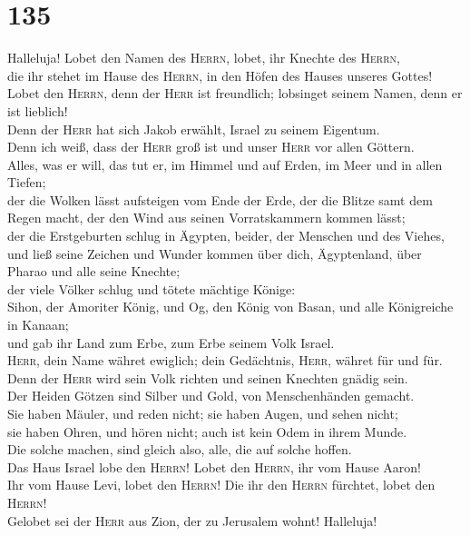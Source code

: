 \hypertarget{section-134}{%
\section{135}\label{section-134}}

 Halleluja! Lobet den Namen des \textsc{Herrn}, lobet, ihr
Knechte des \textsc{Herrn},\\
 die ihr stehet im Hause des \textsc{Herrn}, in den Höfen
des Hauses unseres Gottes!\\
 Lobet den \textsc{Herrn}, denn der \textsc{Herr} ist
freundlich; lobsinget seinem Namen, denn er ist lieblich!\\
 Denn der \textsc{Herr} hat sich Jakob erwählt, Israel zu
seinem Eigentum.\\
 Denn ich weiß, dass der \textsc{Herr} groß ist und unser
\textsc{Herr} vor allen Göttern.\\
 Alles, was er will, das tut er, im Himmel und auf Erden,
im Meer und in allen Tiefen;\\
 der die Wolken lässt aufsteigen vom Ende der Erde, der
die Blitze samt dem Regen macht, der den Wind aus seinen Vorratskammern
kommen lässt;\\
 der die Erstgeburten schlug in Ägypten, beider, der
Menschen und des Viehes,\\
 und ließ seine Zeichen und Wunder kommen über dich,
Ägyptenland, über Pharao und alle seine Knechte;\\
 der viele Völker schlug und tötete mächtige Könige:\\
 Sihon, der Amoriter König, und Og, den König von Basan,
und alle Königreiche in Kanaan;\\
 und gab ihr Land zum Erbe, zum Erbe seinem Volk
Israel.\\
 \textsc{Herr}, dein Name währet ewiglich; dein
Gedächtnis, \textsc{Herr}, währet für und für.\\
 Denn der \textsc{Herr} wird sein Volk richten und seinen
Knechten gnädig sein.\\
 Der Heiden Götzen sind Silber und Gold, von
Menschenhänden gemacht.\\
 Sie haben Mäuler, und reden nicht; sie haben Augen, und
sehen nicht;\\
 sie haben Ohren, und hören nicht; auch ist kein Odem in
ihrem Munde.\\
 Die solche machen, sind gleich also, alle, die auf
solche hoffen.\\
 Das Haus Israel lobe den \textsc{Herrn}! Lobet den
\textsc{Herrn}, ihr vom Hause Aaron!\\
 Ihr vom Hause Levi, lobet den \textsc{Herrn}! Die ihr
den \textsc{Herrn} fürchtet, lobet den \textsc{Herrn}!\\
 Gelobet sei der \textsc{Herr} aus Zion, der zu Jerusalem
wohnt! Halleluja!

